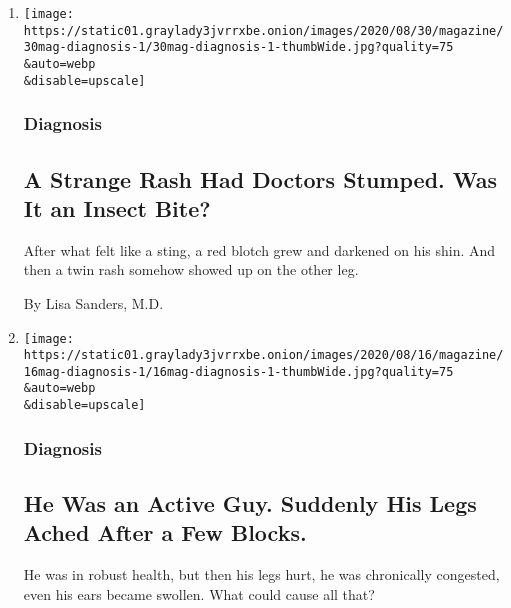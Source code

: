 \begin{enumerate}
\def\labelenumi{\arabic{enumi}.}
\item
  \href{/2020/08/27/magazine/allergic-contact-dermatitis-acd.html}{}

  \texttt{[image: https://static01.graylady3jvrrxbe.onion/images/2020/08/30/magazine/30mag-diagnosis-1/30mag-diagnosis-1-thumbWide.jpg?quality=75\\\&auto=webp\\\&disable=upscale]}

  \hypertarget{diagnosis}{%
  \subsubsection{Diagnosis}\label{diagnosis}}

  \hypertarget{a-strange-rash-had-doctors-stumped-was-it-an-insect-bite}{%
  \subsection{A Strange Rash Had Doctors Stumped. Was It an Insect
  Bite?}\label{a-strange-rash-had-doctors-stumped-was-it-an-insect-bite}}

  After what felt like a sting, a red blotch grew and darkened on his
  shin. And then a twin rash somehow showed up on the other leg.

  By Lisa Sanders, M.D.
\item
  \href{/2020/08/13/magazine/granulomatosis-with-polyangiitis.html}{}

  \texttt{[image: https://static01.graylady3jvrrxbe.onion/images/2020/08/16/magazine/16mag-diagnosis-1/16mag-diagnosis-1-thumbWide.jpg?quality=75\\\&auto=webp\\\&disable=upscale]}

  \hypertarget{diagnosis-1}{%
  \subsubsection{Diagnosis}\label{diagnosis-1}}

  \hypertarget{he-was-an-active-guy-suddenly-his-legs-ached-after-a-few-blocks}{%
  \subsection{He Was an Active Guy. Suddenly His Legs Ached After a Few
  Blocks.}\label{he-was-an-active-guy-suddenly-his-legs-ached-after-a-few-blocks}}

  He was in robust health, but then his legs hurt, he was chronically
  congested, even his ears became swollen. What could cause all that?


\end{enumerate}
